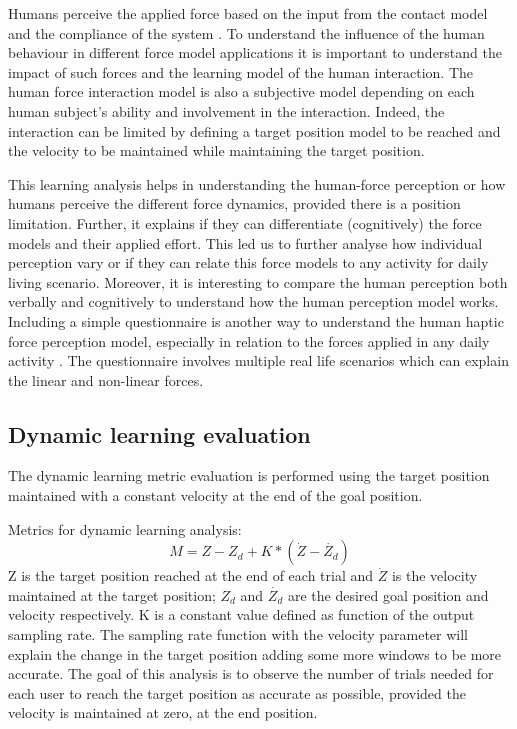 Humans perceive the applied force based on the input from the contact model and the compliance of the system \cite{pongrac2006}. To understand the influence of the human behaviour in different force model applications it is important to understand the impact of such forces and the learning model of the human interaction. The human force interaction model is also a subjective model depending on  each human subject’s ability and involvement in the interaction. Indeed, the interaction can be limited by defining a target position model to be reached and the velocity to be maintained while maintaining the target position.

This learning analysis helps in understanding the human-force perception or how humans perceive the different force dynamics, provided there is a position limitation. Further, it explains if they can differentiate (cognitively) the force models and their applied effort. This led us to further analyse how individual perception vary or if they can relate this force models to any activity for daily living scenario. Moreover, it is interesting to compare the human perception both verbally and cognitively to understand how the human perception model works. Including a simple questionnaire is another way to understand the human haptic force perception model, especially in relation to the forces applied in any daily activity \cite{van2014}. The questionnaire involves multiple real life scenarios which can explain the linear and non-linear forces.

\subsection*{Dynamic learning evaluation}
The dynamic learning metric evaluation is performed using the target position maintained with a constant velocity at the end of the goal position.

Metrics for dynamic learning analysis:
%
\begin{equation}
  M=Z-Z_d +K* (\dot{Z}-\dot{Z_d})
\end{equation}
%
Z is the target position reached at the end of each trial and $\dot{Z} $ is the velocity maintained at the target position; $Z_d$  and $\dot{Z_d }$  are the desired goal position and velocity respectively. K is a constant value defined as function of the output sampling rate. The sampling rate function with the velocity parameter will explain the change in the target position adding some more windows to be more accurate.  The goal of this analysis is to observe the number of trials needed for each user to reach the target position as accurate as possible, provided the velocity is maintained at zero, at the end position.
	
